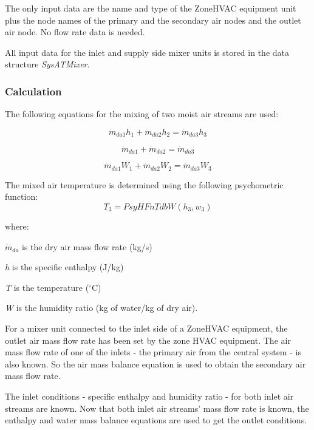 The only input data are the name and type of the ZoneHVAC equipment unit plus the node names of the primary and the secondary air nodes and the outlet air node. No flow rate data is needed.

All input data for the inlet and supply side mixer units is stored in the data structure \emph{SysATMixer}.

\subsubsection{Calculation}\label{calculation-1-000}

The following equations for the mixing of two moist air streams are used:

\begin{equation}
{\dot m_{da1}}{h_1} + {\dot m_{da2}}{h_2} = {\dot m_{da3}}{h_3}
\end{equation}

\begin{equation}
{\dot m_{da1}} + {\dot m_{da2}} = {\dot m_{da3}}
\end{equation}

\begin{equation}
{\dot m_{da1}}{W_1} + {\dot m_{da2}}{W_2} = {\dot m_{da3}}{W_3}
\end{equation}

The mixed air temperature is determined using the following psychometric function:
\begin{equation}
{T_3} = PsyHFnTdbW({h_3}, {w_3})
\end{equation}

where:

\({\dot m_{da}}\) is the dry air mass flow rate (kg/s)

\emph{h} is the specific enthalpy (J/kg)

\emph{T} is the temperature (\(^{\circ}\)C)

\emph{W} is the humidity ratio (kg of water/kg of dry air).

For a mixer unit connected to the inlet side of a ZoneHVAC equipment, the outlet air mass flow rate has been set by the zone HVAC equipment. The air mass flow rate of one of the inlets - the primary air from the central system - is also known. So the air mass balance equation is used to obtain the secondary air mass flow rate.

The inlet conditions - specific enthalpy and humidity ratio - for both inlet air streams are known. Now that both inlet air streams' mass flow rate is known, the enthalpy and water mass balance equations are used to get the outlet conditions.

